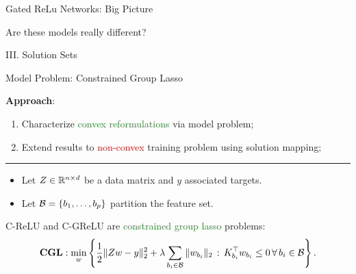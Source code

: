 \documentclass[usenames,dvipsnames,mathserif,notheorems]{beamer}
\newcommand{\horizontalrule}{
	{
			\vspace{-0.5em}
			\center \rule{\textwidth}{0.1em}
			\vspace{-0.2em}
		}
}
\newcommand{\red}[1]{\textcolor{Red}{#1}}
\newcommand{\green}[1]{\textcolor{ForestGreen}{#1}}
\begin{document}
\begin{frame}{Gated ReLu Networks: Big Picture}
	\begin{center}
		\Large Are these models really different?
	\end{center}

	\pause

	\begin{figure}[]
		\centering
		
	\end{figure}
\end{frame}


\begin{frame}{}
	\begin{center}
		\huge III. Solution Sets
	\end{center}
\end{frame}

\begin{frame}{Model Problem: Constrained Group Lasso}

	{
		\large
		\textbf{Approach}:
		\begin{enumerate}
            \large
			\item \pause
			      Characterize \green{convex reformulations} via model problem;
			      \vspace{1ex}
			\item \pause
			      Extend results to \red{non-convex} training problem
			      using solution mapping;
		\end{enumerate}
	}

	\pause
	\horizontalrule

	\begin{itemize}
		\item Let \( Z \in \mathbb{R}^{n \times d} \) be a data matrix and \( y \) associated targets.
		      \pause
		\item Let \( \mathcal{B} = \left\{b_1, \ldots, b_p\right\} \) partition the
		      feature set.
		      \pause
	\end{itemize}

	\vspace{2ex}

	C-ReLU and C-GReLU are \green{constrained group lasso} problems:
	\vspace{-1ex}
	\begin{equation*}
		\textbf{CGL}: \min_{w}
		\left\{ \frac 1 2 \|Z w - y\|_2^2
			+ \lambda \sum_{{b_i} \in \mathcal{B}} \|w_{b_i}\|_2
			\, : \, K_{{b_i}}^\top w_{b_i} \leq 0 \, \forall \, {b_i} \in \mathcal{B}\right\}.
	\end{equation*}

\end{frame}
\end{document}
